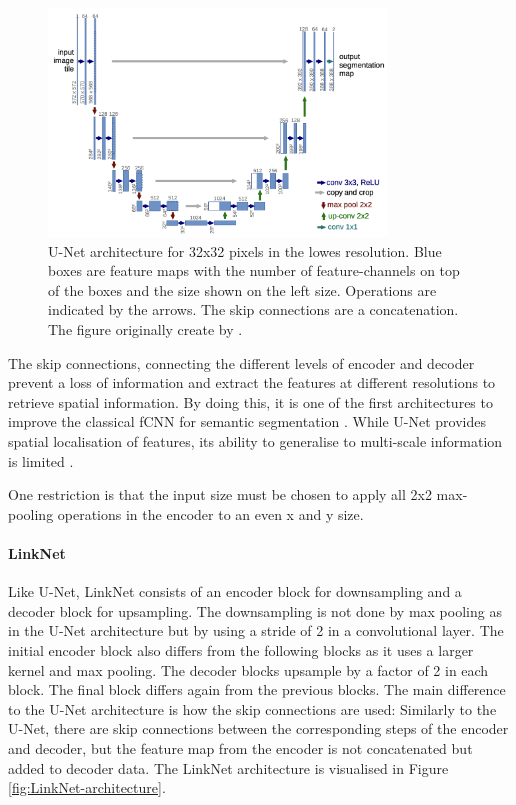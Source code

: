 \begin{figure}[htb!]
	\centering
	\includegraphics[width=0.8\textwidth]{fig/unet-architecture.png}
	\caption{U-Net architecture for 32x32 pixels in the lowes resolution. Blue boxes are feature maps with the number of feature-channels on top of the boxes and the size shown on the left size. Operations are indicated by the arrows. The skip connections are a concatenation. The figure originally create by \citeauthor{unet} \cite{unet}.}
	\label{fig:unet-architecture}
\end{figure}

The skip connections, connecting the different levels of encoder and decoder prevent a loss of information and extract the features at different resolutions to retrieve spatial information. By doing this, it is one of the first architectures to improve the classical fCNN for semantic segmentation \cite{Litjens2017}. While U-Net provides spatial localisation of features, its ability to generalise to multi-scale information is limited \cite{Norelyaqine2023}.

One restriction is that the input size must be chosen to apply all 2x2 max-pooling operations in the encoder to an even x and y size.


\paragraph{LinkNet}

Like U-Net, LinkNet consists of an encoder block for downsampling and a decoder block for upsampling. The downsampling is not done by max pooling as in the U-Net architecture but by using a stride of 2 in a convolutional layer. The initial encoder block also differs from the following blocks as it uses a larger kernel and max pooling. The decoder blocks upsample by a factor of 2 in each block. The final block differs again from the previous blocks. The main difference to the U-Net architecture is how the skip connections are used: Similarly to the U-Net, there are skip connections between the corresponding steps of the encoder and decoder, but the feature map from the encoder is not concatenated but added to decoder data. The LinkNet architecture is visualised in Figure \ref{fig:LinkNet-architecture}. \cite{LinkNet}

